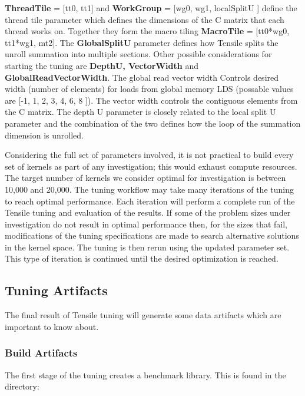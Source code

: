 \documentclass[]{article}
\begin{document}
{\color{ForestGreen} \bf ThreadTile} = [tt0, tt1] and {\color{ForestGreen} \bf  WorkGroup} = [wg0, wg1, localSplitU ] define the thread tile parameter which defines the dimensions of the C matrix that each thread works on. Together they form the macro tiling {\color{ForestGreen} \bf MacroTile} = [tt0*wg0, tt1*wg1, mt2]. The {\color{ForestGreen} \bf GlobalSplitU} parameter defines how Tensile splits the unroll summation into multiple sections. Other possible considerations for starting the tuning are {\color{ForestGreen} \bf DepthU, VectorWidth} and {\color{ForestGreen} \bf GlobalReadVectorWidth}. The global read vector width Controls desired width (number of elements) for loads from global memory LDS (possable values are [-1, 1, 2, 3, 4, 6, 8 ]). The vector width controls the contiguous elements from the C matrix. The depth U parameter is closely related to the local split U parameter and the combination of the two defines how the loop of the summation dimension is unrolled.

Considering the full set of parameters involved, it is not practical to build every set of kernels as part of any investigation; this would exhaust compute resources. The target number of kernels we consider optimal for investigation is between 10,000 and 20,000. The tuning workflow may take many iterations of the tuning to reach optimal performance. Each iteration will perform a complete run of the Tensile tuning and evaluation of the results. If some of the problem sizes under investigation do not result in optimal performance then, for the sizes that fail, modifications of the tuning specifications are made to search alternative solutions in the kernel space. The tuning is then rerun using the updated parameter set. This type of iteration is continued until the desired optimization is reached.

\subsection{Tuning Artifacts}
The final result of Tensile tuning will generate some data artifacts which are important to know about.

\subsubsection{Build Artifacts}
\label{sec:einstein}

\noindent
The first stage of the tuning creates a benchmark library. This is found in the directory:
\end{document}
